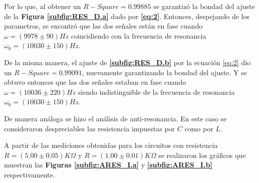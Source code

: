 \documentclass[11pt,a4paper]{article}
\begin{document}
Por lo que, al obtener un $R-Square = 0.99885$ se garantizó la bondad del ajuste de la \textbf{Figura \ref{subfig:RES_D.a}} dado por \textbf{\eqref{eq:2}}. Entonces, despejando de los parametros, se encontró que las dos señales están en fase cuando $\omega = ( 9978 \pm 90) Hz$ coincidiendo con la frecuencia de resonancia $\omega_{0} = (10030 \pm 150) Hz$.

De la misma manera, el ajuste de \textbf{\ref{subfig:RES_D.b}} por la ecuación \eqref{eq:2} dio un $R-Square = 0.99091$, nuevamente garantizando la bondad del ajuste. Y se obtuvo entonces que las dos señales estaban en fase cuando $\omega = (10036 \pm 220) Hz$ siendo indistinguible de la frecuencia de resonancia $\omega_{0} = (10030 \pm 150) Hz$.

\bigskip

De manera análoga se hizo el análisis de anti-resonancia. En este caso se consideraron despreciables las resistencia impuestas por $C$ como por $L$.

A partir de las mediciones obtenidas para los circuitos con resistencia $R=(5.00 \pm 0.05) K\Omega$ y $R=(1.00 \pm 0.01)K\Omega$ se realizaron los gráficos que muestran las \textbf{Figuras \ref{subfig:ARES_I.a}} y \textbf{\ref{subfig:ARES_I.b}} respectivamente.
\end{document}
